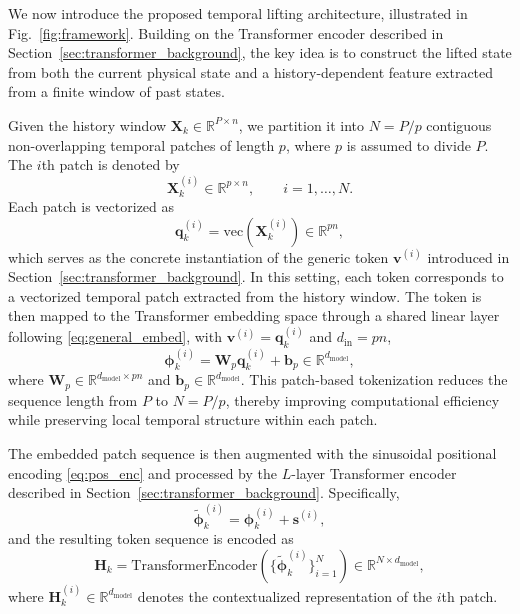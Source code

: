 \documentclass[journal]{IEEEtran}
\newcommand{\vs}{\mathbf{s}}
\newcommand{\vb}{\mathbf{b}}
\newcommand{\vphi}{\boldsymbol{\phi}}
\newcommand{\vq}{\mathbf{q}}
\newcommand{\mW}{\mathbf{W}}
\newcommand{\mX}{\mathbf{X}}
\newcommand{\mH}{\mathbf{H}}
\begin{document}
We now introduce the proposed temporal lifting architecture, illustrated in Fig.~\ref{fig:framework}. Building on the Transformer encoder described in Section~\ref{sec:transformer_background}, the key idea is to construct the lifted state from both the current physical state and a history-dependent feature extracted from a finite window of past states.

Given the history window $\mX_k \in \mathbb{R}^{P \times n}$, we partition it into $N = P/p$ contiguous non-overlapping temporal patches of length $p$, where $p$ is assumed to divide $P$. The $i$th patch is denoted by
\begin{equation}
    \mX_k^{(i)} \in \mathbb{R}^{p \times n}, \qquad i=1,\ldots,N.
\end{equation}
Each patch is vectorized as
\begin{equation}
    \vq_k^{(i)} = \mathrm{vec}(\mX_k^{(i)}) \in \mathbb{R}^{pn},
    \label{eq:patch_vec}
\end{equation}
which serves as the concrete instantiation of the generic token $\mathbf{v}^{(i)}$ introduced in Section~\ref{sec:transformer_background}. In this setting, each token corresponds to a vectorized temporal patch extracted from the history window. The token is then mapped to the Transformer embedding space through a shared linear layer following \eqref{eq:general_embed}, with $\mathbf{v}^{(i)} = \vq_k^{(i)}$ and $d_{\mathrm{in}} = pn$,
\begin{equation}
    \vphi_k^{(i)} = \mW_p \vq_k^{(i)} + \vb_p \in \mathbb{R}^{d_{\mathrm{model}}},
    \label{eq:patch_embedding}
\end{equation}
where $\mW_p \in \mathbb{R}^{d_{\mathrm{model}} \times pn}$ and $\vb_p \in \mathbb{R}^{d_{\mathrm{model}}}$. This patch-based tokenization reduces the sequence length from $P$ to $N=P/p$, thereby improving computational efficiency while preserving local temporal structure within each patch.

The embedded patch sequence is then augmented with the sinusoidal positional encoding \eqref{eq:pos_enc} and processed by the $L$-layer Transformer encoder described in Section~\ref{sec:transformer_background}. Specifically,
\begin{equation}
    \tilde{\vphi}_k^{(i)} = \vphi_k^{(i)} + \vs^{(i)},
    \label{eq:pos_enc_applied}
\end{equation}
and the resulting token sequence is encoded as
\begin{equation}
    \mH_k = \mathrm{TransformerEncoder}\!\left(
        \{\tilde{\vphi}_k^{(i)}\}_{i=1}^{N}
    \right) \in \mathbb{R}^{N \times d_{\mathrm{model}}},
    \label{eq:transformer_enc}
\end{equation}
where $\mH_k^{(i)} \in \mathbb{R}^{d_{\mathrm{model}}}$ denotes the contextualized representation of the $i$th patch.
\end{document}
